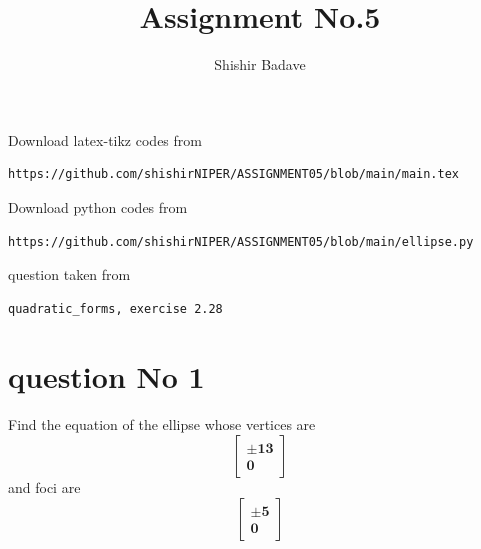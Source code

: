 \documentclass[journal,12pt,twocolumn]{IEEEtran}
\begin{document}
\makeatother
\let\StandardTheFigure\thefigure
\let\vec\mathbf
\renewcommand{\thefigure}{\theproblem}
\def\putbox#1#2#3{\makebox[0in][l]{\makebox[#1][l]{}\raisebox{\baselineskip}[0in][0in]{\raisebox{#2}[0in][0in]{#3}}}}
     \def\rightbox#1{\makebox[0in][r]{#1}}
     \def\centbox#1{\makebox[0in]{#1}}
     \def\topbox#1{\raisebox{-\baselineskip}[0in][0in]{#1}}
     \def\midbox#1{\raisebox{-0.5\baselineskip}[0in][0in]{#1}}
\vspace{3cm}
\title{Assignment No.5}
\author{Shishir Badave}
\maketitle
\newpage
\bigskip
\renewcommand{\thefigure}{\theenumi}
\renewcommand{\thetable}{\theenumi}
Download latex-tikz codes from
\begin{lstlisting}
https://github.com/shishirNIPER/ASSIGNMENT05/blob/main/main.tex
\end{lstlisting}
%
Download python codes from
\begin{lstlisting}
https://github.com/shishirNIPER/ASSIGNMENT05/blob/main/ellipse.py
\end{lstlisting}
%
question taken from
\begin{lstlisting}
quadratic_forms, exercise 2.28
\end{lstlisting}
\section{question No 1}
Find the equation of the ellipse whose vertices
are $$\vec{\begin{bmatrix}\pm 13 \\ 0 \end{bmatrix}}$$ and foci are $$\vec{\begin{bmatrix}\pm 5 \\ 0 \end{bmatrix}}$$
\end{document}
